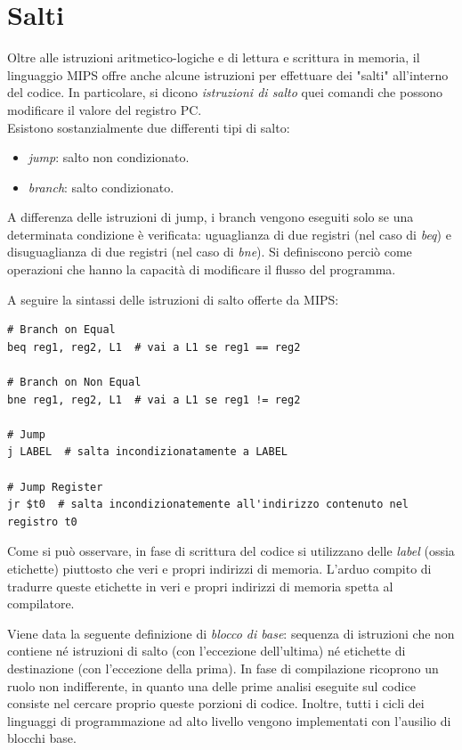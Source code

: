 \documentclass[class=book, crop=false]{standalone}
\begin{document}
\section{Salti}
Oltre alle istruzioni aritmetico-logiche e di lettura e scrittura in memoria, il linguaggio MIPS offre anche alcune istruzioni per effettuare dei "salti" all'interno del codice. In particolare, si dicono \emph{istruzioni di salto} quei comandi che possono modificare il valore del registro PC.\\
Esistono sostanzialmente due differenti tipi di salto:
\begin{itemize}
	\item \emph{jump}: salto non condizionato.
	\item \emph{branch}: salto condizionato.
\end{itemize}
A differenza delle istruzioni di jump, i branch vengono eseguiti solo se una determinata condizione è verificata: uguaglianza di due registri (nel caso di \emph{beq}) e disuguaglianza di due registri (nel caso di \emph{bne}). Si definiscono perciò come operazioni che hanno la capacità di modificare il flusso del programma.

A seguire la sintassi delle istruzioni di salto offerte da MIPS:
\begin{verbatim}
# Branch on Equal
beq reg1, reg2, L1  # vai a L1 se reg1 == reg2

# Branch on Non Equal
bne reg1, reg2, L1  # vai a L1 se reg1 != reg2

# Jump
j LABEL  # salta incondizionatamente a LABEL

# Jump Register
jr $t0  # salta incondizionatemente all'indirizzo contenuto nel registro t0
\end{verbatim}

Come si può osservare, in fase di scrittura del codice si utilizzano delle \emph{label} (ossia etichette) piuttosto che veri e propri indirizzi di memoria. L'arduo compito di tradurre queste etichette in veri e propri indirizzi di memoria spetta al compilatore.

Viene data la seguente definizione di \emph{blocco di base}: sequenza di istruzioni che non contiene né istruzioni di salto (con l’eccezione dell’ultima) né etichette di destinazione (con l’eccezione della prima). In fase di compilazione ricoprono un ruolo non indifferente, in quanto una delle prime analisi eseguite sul codice consiste nel cercare proprio queste porzioni di codice. Inoltre, tutti i cicli dei linguaggi di programmazione ad alto livello vengono implementati con l'ausilio di blocchi base.
\end{document}
